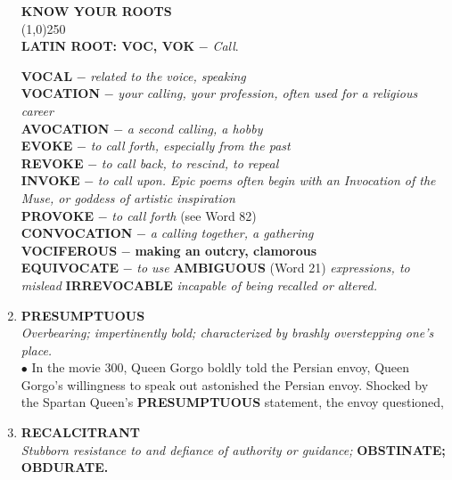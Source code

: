 \documentclass{book}
\begin{document}
\begin{enumerate}
\begin{tcolorbox}
\begin{center}
\textbf{ KNOW YOUR ROOTS}\\
\line(1,0){250}\\
\textbf{LATIN ROOT: VOC, VOK} $ - $ \textit{Call}.\\  
\end{center}  
\textbf{VOCAL} $ - $ \textit{related to the voice, speaking}\\
\textbf{VOCATION} $-$ \textit{your calling, your profession, often used for a religious career}\\
\textbf{AVOCATION} $-$  \textit{a second calling, a hobby}\\ 
\textbf{EVOKE} $-$  \textit{to call forth, especially from the past}\\
\textbf{REVOKE} $-$  \textit{to call back, to rescind, to repeal}\\ 
\textbf{INVOKE} $-$ \textit{to call upon. Epic poems often begin with an Invocation of the Muse, or goddess of artistic inspiration}\\
\textbf{PROVOKE} $-$  \textit{to call forth} (see Word 82)\\ 
\textbf{CONVOCATION} $-$ \textit{a calling together, a gathering}\\
\textbf{VOCIFEROUS} $-$ \textbf{making an outcry, clamorous}\\
\textbf{EQUIVOCATE} $-$  \textit{to use} \textbf{AMBIGUOUS} (Word 21) \textit{expressions, to mislead} \textbf{IRREVOCABLE} \textit{incapable of being recalled or altered.}
\end{tcolorbox}

\item \textbf{PRESUMPTUOUS}\\
\textit{Overbearing; impertinently bold; characterized by brashly overstepping one's place.}\\

$ \bullet $ In the movie 300, Queen Gorgo boldly told the
Persian envoy,  Queen Gorgo's willingness to speak out astonished the Persian envoy.
Shocked by the Spartan Queen's \textbf{PRESUMPTUOUS}
statement, the envoy questioned, 

\item \textbf{RECALCITRANT}\\
\textit{Stubborn resistance to and defiance of authority or guidance;} \textbf{OBSTINATE; OBDURATE.}\\


\end{enumerate}
\end{document}
